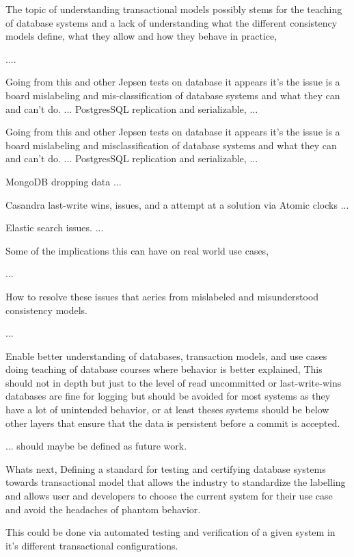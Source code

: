 \documentclass[a4paper,10pt,titlepage]{report}
\begin{document}
    The topic of understanding transactional models possibly stems for the teaching of database systems and a lack of understanding what the different consistency models define, what they allow and how they behave in practice,

    ....

    Going from this and other Jepsen tests on database it appears it's the issue is a board mislabeling and mis-classification of database systems and what they can and can't do.
    ...
    PostgresSQL replication and serializable,
    ...

    Going from this and other Jepsen tests on database it appears it's the issue is a board mislabeling and misclassification of database systems and what they can and can't do.
    ...
    PostgresSQL replication and serializable,
    ...

    MongoDB dropping data
    ...

    Casandra last-write wins, issues, and a attempt at a solution via Atomic clocks
    ...

    Elastic search issues.
    ...

    Some of the implications this can have on real world use cases,

    ...

    How to resolve these issues that aeries from mislabeled and misunderstood consistency models.

    ...

    Enable better understanding of databases, transaction models, and use cases doing teaching of database courses where behavior is better explained, This should not in depth but just to the level of read uncommitted or last-write-wins databases are fine for logging but should be avoided for most systems as they have a lot of unintended behavior, or at least theses systems should be below other layers that ensure that the data is persistent before a commit is accepted.

    ... should maybe be defined as future work.

    Whats next, Defining a standard for testing and certifying database systems towards transactional model that allows the industry to standardize the labelling and allows user and developers to choose the current system for their use case and avoid the headaches of phantom behavior.

    This could be done via automated testing and verification of a given system in it's different transactional configurations.
\end{document}
